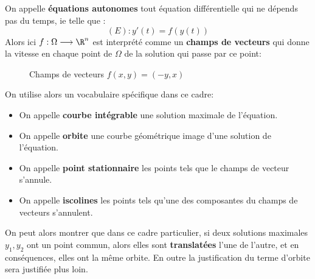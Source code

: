 \subsection*{}
On appelle \textbf{équations autonomes} tout équation différentielle qui ne dépends pas du temps, ie telle que :
\[ 
   (E): y'(t) = f(y(t)) 
\]
Alors ici \( f : \Omega \longrightarrow \R^n \) est interprété comme un \textbf{champs de vecteurs} qui donne la vitesse en chaque point de \( \Omega \) de la solution qui passe par ce point:
\begin{figure*}[h]
   \centering
   \caption{Champs de vecteurs \( f(x, y) = (-y, x) \)}
\end{figure*}
On utilise alors un vocabulaire spécifique dans ce cadre:
\begin{itemize}
   \item On appelle \textbf{courbe intégrable} une solution maximale de l'équation.
   \item On appelle \textbf{orbite} une courbe géométrique image d'une solution de l'équation.
   \item On appelle \textbf{point stationnaire} les points tels que le champs de vecteur s'annule.
   \item On appelle \textbf{iscolines} les points tels qu'une des composantes du champs de vecteurs s'annulent.
\end{itemize}
On peut alors montrer que dans ce cadre particulier, si deux solutions maximales \( y_1, y_2 \) ont un point commun, alors elles sont \textbf{translatées} l'une de l'autre, et en conséquences, elles ont la même orbite. En outre la justification du terme d'orbite sera justifiée plus loin.
